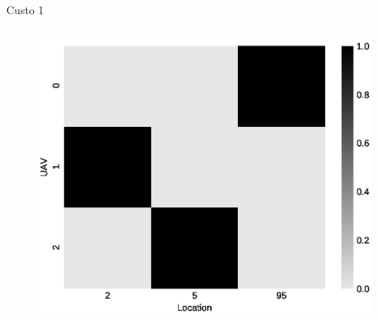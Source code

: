 \begin{frame}{Custo 1}
\begin{columns}
\begin{column}{0.45\textwidth}
\begin{figure}[!htb]
                \end{figure}
                \vspace{-0.5cm}
               \begin{figure}[!htb]
                    \includegraphics[width=\textwidth]{custo_1/980_f_mij_.eps}
                \end{figure}
            \end{column}
        \end{columns}
    \end{frame}